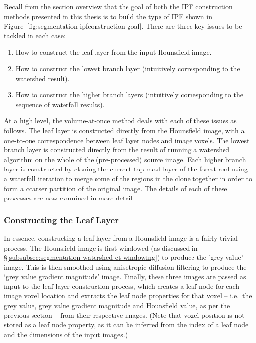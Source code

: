 Recall from the section overview that the goal of both the IPF construction methods presented in this thesis is to build the type of IPF shown in Figure~\ref{fig:segmentation-ipfconstruction-goal}. There are three key issues to be tackled in each case:
%
\begin{enumerate}
\item How to construct the leaf layer from the input Hounsfield image.
\item How to construct the lowest branch layer (intuitively corresponding to the watershed result).
\item How to construct the higher branch layers (intuitively corresponding to the sequence of waterfall results).
\end{enumerate}
%
At a high level, the volume-at-once method deals with each of these issues as follows. The leaf layer is constructed directly from the Hounsfield image, with a one-to-one correspondence between leaf layer nodes and image voxels. The lowest branch layer is constructed directly from the result of running a watershed algorithm on the whole of the (pre-processed) source image. Each higher branch layer is constructed by cloning the current top-most layer of the forest and using a waterfall iteration to merge some of the regions in the clone together in order to form a coarser partition of the original image. The details of each of these processes are now examined in more detail.

\subsubsection{Constructing the Leaf Layer}

In essence, constructing a leaf layer from a Hounsfield image is a fairly trivial process. The Hounsfield image is first windowed (as discussed in \S\ref{subsubsec:segmentation-watershed-ct-windowing}) to produce the `grey value' image. This is then smoothed using anisotropic diffusion filtering to produce the `grey value gradient magnitude' image. Finally, these three images are passed as input to the leaf layer construction process, which creates a leaf node for each image voxel location and extracts the leaf node properties for that voxel -- i.e.~the grey value, grey value gradient magnitude and Hounsfield value, as per the previous section -- from their respective images. (Note that voxel position is not stored as a leaf node property, as it can be inferred from the index of a leaf node and the dimensions of the input images.)

